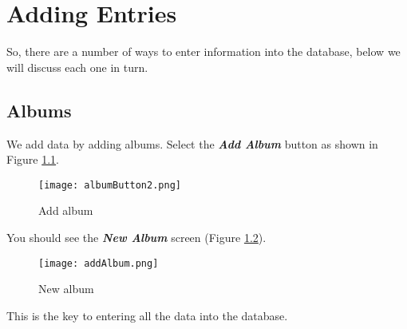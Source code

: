 \chapter{Adding Entries}
So, there are a number of ways to enter information into the database, below we will discuss each one in turn.
\section{Albums}
\label{sect:albums}
We add data by adding albums.  Select the 
\textit{\textbf{Add Album}}
button as shown in Figure 
\ref{fig:Add album}.
\begin{figure}[!h]
 \centering
 \texttt{[image: albumButton2.png]} 
 \caption{Add album}
 \label{fig:Add album}
\end{figure}
You should see the 
\textit{\textbf{New Album}}
screen (Figure 
\ref{fig:New album}).
\begin{figure}[!h]
 \centering
 \texttt{[image: addAlbum.png]}
 \caption{New album}
 \label{fig:New album}
\end{figure} 
This is the key to entering all the data into the database.

